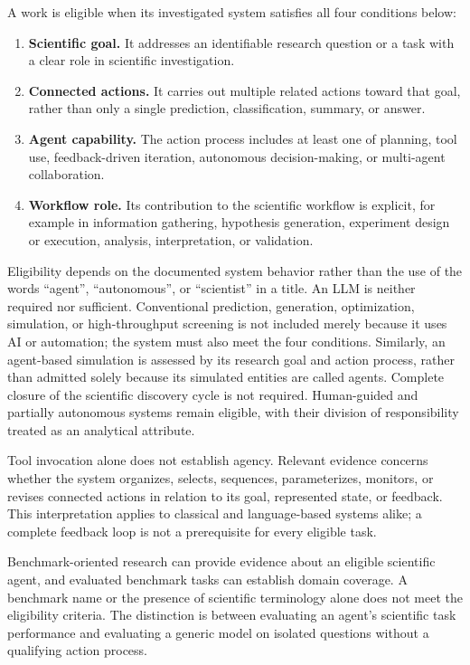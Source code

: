 A work is eligible when its investigated system satisfies all four conditions below:
\begin{enumerate}
    \item \textbf{Scientific goal.} It addresses an identifiable research question or a task with a clear role in scientific investigation.
    \item \textbf{Connected actions.} It carries out multiple related actions toward that goal, rather than only a single prediction, classification, summary, or answer.
    \item \textbf{Agent capability.} The action process includes at least one of planning, tool use, feedback-driven iteration, autonomous decision-making, or multi-agent collaboration.
    \item \textbf{Workflow role.} Its contribution to the scientific workflow is explicit, for example in information gathering, hypothesis generation, experiment design or execution, analysis, interpretation, or validation.
\end{enumerate}

Eligibility depends on the documented system behavior rather than the use of the words ``agent'', ``autonomous'', or ``scientist'' in a title. An LLM is neither required nor sufficient. Conventional prediction, generation, optimization, simulation, or high-throughput screening is not included merely because it uses AI or automation; the system must also meet the four conditions. Similarly, an agent-based simulation is assessed by its research goal and action process, rather than admitted solely because its simulated entities are called agents. Complete closure of the scientific discovery cycle is not required. Human-guided and partially autonomous systems remain eligible, with their division of responsibility treated as an analytical attribute.

Tool invocation alone does not establish agency. Relevant evidence concerns whether the system organizes, selects, sequences, parameterizes, monitors, or revises connected actions in relation to its goal, represented state, or feedback. This interpretation applies to classical and language-based systems alike; a complete feedback loop is not a prerequisite for every eligible task.

Benchmark-oriented research can provide evidence about an eligible scientific agent, and evaluated benchmark tasks can establish domain coverage. A benchmark name or the presence of scientific terminology alone does not meet the eligibility criteria. The distinction is between evaluating an agent's scientific task performance and evaluating a generic model on isolated questions without a qualifying action process.

